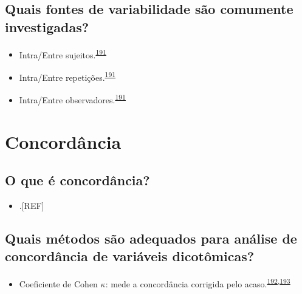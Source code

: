 \documentclass[
  a4paper,
]{book}
\providecommand{\tightlist}{%
  \setlength{\itemsep}{0pt}\setlength{\parskip}{0pt}}
\begin{document}
\hypertarget{quais-fontes-de-variabilidade-suxe3o-comumente-investigadas}{%
\subsection{Quais fontes de variabilidade são comumente investigadas?}\label{quais-fontes-de-variabilidade-suxe3o-comumente-investigadas}}

\begin{itemize}
\item
  Intra/Entre sujeitos.\textsuperscript{\protect\hyperlink{ref-altman1983}{191}}
\item
  Intra/Entre repetições.\textsuperscript{\protect\hyperlink{ref-altman1983}{191}}
\item
  Intra/Entre observadores.\textsuperscript{\protect\hyperlink{ref-altman1983}{191}}
\end{itemize}

\hypertarget{concordancia}{%
\section{Concordância}\label{concordancia}}

\hypertarget{o-que-uxe9-concorduxe2ncia}{%
\subsection{O que é concordância?}\label{o-que-uxe9-concorduxe2ncia}}

\begin{itemize}
\tightlist
\item
  .{[}REF{]}
\end{itemize}

\hypertarget{quais-muxe9todos-suxe3o-adequados-para-anuxe1lise-de-concorduxe2ncia-de-variuxe1veis-dicotuxf4micas}{%
\subsection{Quais métodos são adequados para análise de concordância de variáveis dicotômicas?}\label{quais-muxe9todos-suxe3o-adequados-para-anuxe1lise-de-concorduxe2ncia-de-variuxe1veis-dicotuxf4micas}}

\begin{itemize}
\tightlist
\item
  Coeficiente de Cohen \(\kappa\): mede a concordância corrigida pelo acaso.\textsuperscript{\protect\hyperlink{ref-scott1955}{192},\protect\hyperlink{ref-cohen1960}{193}}
\end{itemize}
\end{document}
